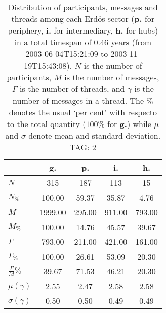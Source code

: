 \begin{table}[h!]
\begin{center}
\begin{tabular}{| l | c | c | c | c |}\hline
 & g. & p. & i. & h. \\\hline
$N$ & 315  & 187  & 113  & 15 \\\hline
$N_{\%}$ & 100.00  & 59.37  & 35.87  & 4.76 \\\hline
$M$ & 1999.00  & 295.00  & 911.00  & 793.00 \\\hline
$M_{\%}$ & 100.00  & 14.76  & 45.57  & 39.67 \\\hline
$\Gamma$ & 793.00  & 211.00  & 421.00  & 161.00 \\\hline
$\Gamma_{\%}$ & 100.00  & 26.61  & 53.09  & 20.30 \\\hline
$\frac{\Gamma}{M}\%$ & 39.67  & 71.53  & 46.21  & 20.30 \\\hline
$\mu(\gamma)$ & 2.55  & 2.47  & 2.58  & 2.58 \\\hline
$\sigma(\gamma)$ & 0.50  & 0.50  & 0.49  & 0.49 \\\hline
\end{tabular}
\caption{Distribution of participants, messages and threads among each Erd\"os sector ({\bf p.} for periphery, {\bf i.} for intermediary, 
    {\bf h.} for hubs) in a total timespan of 0.46 years (from 2003-06-04T15:21:09 to 2003-11-19T15:43:08). $N$ is the number of participants, $M$ is the number of messages, $\Gamma$ is the number of threads, and $\gamma$ is the number of messages in a thread.
    The \% denotes the usual `per cent' with respecto to the total quantity ($100\%$ for {\bf g.})
    while $\mu$ and $\sigma$ denote mean and standard deviation. TAG: 2}
\end{center}
\end{table}